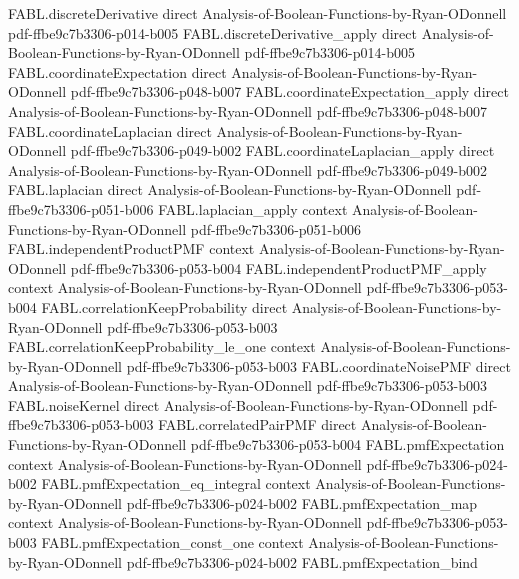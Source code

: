 \begin{theorem}
\proofstep
  {FABL.discreteDerivative}
  {direct}
  {Analysis-of-Boolean-Functions-by-Ryan-ODonnell}
  {pdf-ffbe9c7b3306-p014-b005}
\proofstep
  {FABL.discreteDerivative_apply}
  {direct}
  {Analysis-of-Boolean-Functions-by-Ryan-ODonnell}
  {pdf-ffbe9c7b3306-p014-b005}
\proofstep
  {FABL.coordinateExpectation}
  {direct}
  {Analysis-of-Boolean-Functions-by-Ryan-ODonnell}
  {pdf-ffbe9c7b3306-p048-b007}
\proofstep
  {FABL.coordinateExpectation_apply}
  {direct}
  {Analysis-of-Boolean-Functions-by-Ryan-ODonnell}
  {pdf-ffbe9c7b3306-p048-b007}
\proofstep
  {FABL.coordinateLaplacian}
  {direct}
  {Analysis-of-Boolean-Functions-by-Ryan-ODonnell}
  {pdf-ffbe9c7b3306-p049-b002}
\proofstep
  {FABL.coordinateLaplacian_apply}
  {direct}
  {Analysis-of-Boolean-Functions-by-Ryan-ODonnell}
  {pdf-ffbe9c7b3306-p049-b002}
\proofstep
  {FABL.laplacian}
  {direct}
  {Analysis-of-Boolean-Functions-by-Ryan-ODonnell}
  {pdf-ffbe9c7b3306-p051-b006}
\proofstep
  {FABL.laplacian_apply}
  {context}
  {Analysis-of-Boolean-Functions-by-Ryan-ODonnell}
  {pdf-ffbe9c7b3306-p051-b006}
\proofstep
  {FABL.independentProductPMF}
  {context}
  {Analysis-of-Boolean-Functions-by-Ryan-ODonnell}
  {pdf-ffbe9c7b3306-p053-b004}
\proofstep
  {FABL.independentProductPMF_apply}
  {context}
  {Analysis-of-Boolean-Functions-by-Ryan-ODonnell}
  {pdf-ffbe9c7b3306-p053-b004}
\proofstep
  {FABL.correlationKeepProbability}
  {direct}
  {Analysis-of-Boolean-Functions-by-Ryan-ODonnell}
  {pdf-ffbe9c7b3306-p053-b003}
\proofstep
  {FABL.correlationKeepProbability_le_one}
  {context}
  {Analysis-of-Boolean-Functions-by-Ryan-ODonnell}
  {pdf-ffbe9c7b3306-p053-b003}
\proofstep
  {FABL.coordinateNoisePMF}
  {direct}
  {Analysis-of-Boolean-Functions-by-Ryan-ODonnell}
  {pdf-ffbe9c7b3306-p053-b003}
\proofstep
  {FABL.noiseKernel}
  {direct}
  {Analysis-of-Boolean-Functions-by-Ryan-ODonnell}
  {pdf-ffbe9c7b3306-p053-b003}
\proofstep
  {FABL.correlatedPairPMF}
  {direct}
  {Analysis-of-Boolean-Functions-by-Ryan-ODonnell}
  {pdf-ffbe9c7b3306-p053-b004}
\proofstep
  {FABL.pmfExpectation}
  {context}
  {Analysis-of-Boolean-Functions-by-Ryan-ODonnell}
  {pdf-ffbe9c7b3306-p024-b002}
\proofstep
  {FABL.pmfExpectation_eq_integral}
  {context}
  {Analysis-of-Boolean-Functions-by-Ryan-ODonnell}
  {pdf-ffbe9c7b3306-p024-b002}
\proofstep
  {FABL.pmfExpectation_map}
  {context}
  {Analysis-of-Boolean-Functions-by-Ryan-ODonnell}
  {pdf-ffbe9c7b3306-p053-b003}
\proofstep
  {FABL.pmfExpectation_const_one}
  {context}
  {Analysis-of-Boolean-Functions-by-Ryan-ODonnell}
  {pdf-ffbe9c7b3306-p024-b002}
\proofstep
  {FABL.pmfExpectation_bind}

\end{theorem}
